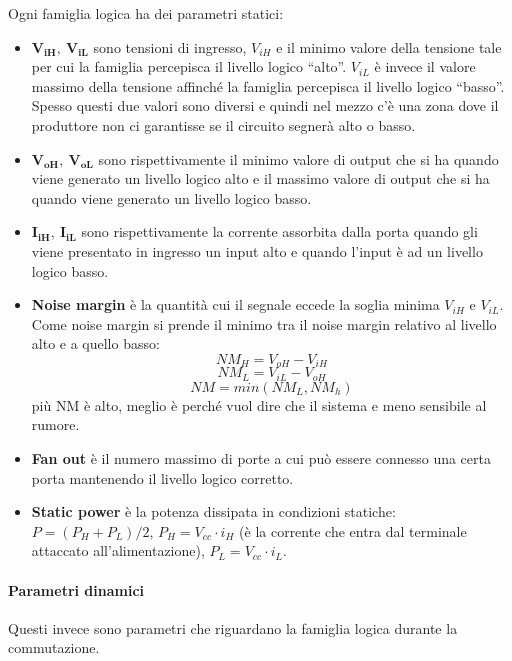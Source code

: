 \documentclass[
]{article}
\providecommand{\tightlist}{%
  \setlength{\itemsep}{0pt}\setlength{\parskip}{0pt}}
\begin{document}
Ogni famiglia logica ha dei parametri statici:

\begin{itemize}
\tightlist
\item
  \(\mathbf{V_{iH}},\ \mathbf{V_{iL}}\) sono tensioni di ingresso,
  \(V_{iH}\) e il minimo valore della tensione tale per cui la famiglia
  percepisca il livello logico ``alto''. \(V_{iL}\) è invece il valore
  massimo della tensione affinché la famiglia percepisca il livello
  logico ``basso''. Spesso questi due valori sono diversi e quindi nel
  mezzo c'è una zona dove il produttore non ci garantisse se il circuito
  segnerà alto o basso.
\item
  \(\mathbf{V_{oH}},\ \mathbf{V_{oL}}\) sono rispettivamente il minimo
  valore di output che si ha quando viene generato un livello logico
  alto e il massimo valore di output che si ha quando viene generato un
  livello logico basso.
\item
  \(\mathbf{I_{iH}},\ \mathbf{I_{iL}}\) sono rispettivamente la corrente
  assorbita dalla porta quando gli viene presentato in ingresso un input
  alto e quando l'input è ad un livello logico basso.\\
\item
  \textbf{Noise margin} è la quantità cui il segnale eccede la soglia
  minima \(V_{iH}\) e \(V_{iL}\). Come noise margin si prende il minimo
  tra il noise margin relativo al livello alto e a quello basso:
  \[NM_{H} =V_{oH}-V_{iH}\] \[NM_{L} =V_{iL}-V_{oH}\]
  \[NM =min(NM_{L},NM_{h})\] più NM è alto, meglio è perché vuol dire
  che il sistema e meno sensibile al rumore.\\
\item
  \textbf{Fan out} è il numero massimo di porte a cui può essere
  connesso una certa porta mantenendo il livello logico corretto.\\
\item
  \textbf{Static power} è la potenza dissipata in condizioni statiche:
  \(P=(P_{H}+P_{L})/2\), \(P_{H}=V_{cc}\cdot i_{H}\) (è la corrente che
  entra dal terminale attaccato all'alimentazione),
  \(P_{L}=V_{cc}\cdot i_{L}\).
\end{itemize}

\paragraph{Parametri dinamici}\label{parametri-dinamici}

Questi invece sono parametri che riguardano la famiglia logica durante
la commutazione.
\end{document}
